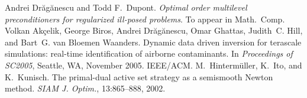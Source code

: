\documentclass{report}
\begin{document}
\begin{thebibliography}{99}
 Andrei Dr{\u a}g{\u a}nescu and Todd F.~Dupont.
\emph{Optimal order multilevel preconditioners for regularized ill-posed problems}.
To appear in Math.~Comp.
 Volkan Ak{\c c}elik, George Biros, Andrei
Dr{\u{a}}g{\u{a}}nescu, Omar Ghattas, Judith~C. Hill, and Bart~G. van
Bloemen Waanders.
Dynamic data driven inversion for terascale simulations: real-time
identification of airborne contaminants.
In \emph{Proceedings of SC2005}, Seattle, WA, November 2005. IEEE/ACM.
 M.~Hinterm{\"u}ller, K.~Ito, and K.~Kunisch. The
primal-dual active set strategy as a semismooth {N}ewton method.
\emph{SIAM J. Optim.}, 13:865--888, 2002.
\end{thebibliography}
\end{document}

